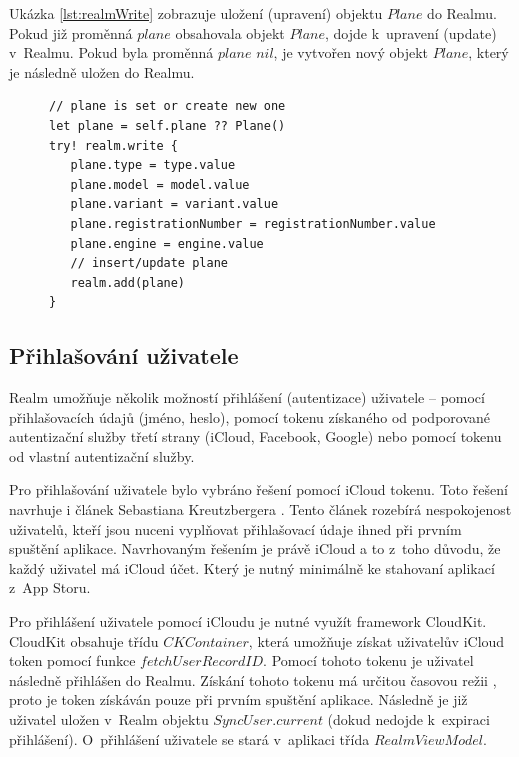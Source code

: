 \documentclass[thesis=M,czech]{FITthesis}[2012/06/26]
\begin{document}
Ukázka \ref{lst:realmWrite} zobrazuje uložení (upravení) objektu $Plane$ do Realmu. Pokud již proměnná $plane$ obsahovala objekt $Plane$, dojde k~upravení (update) v~Realmu. Pokud byla proměnná $plane$ $nil$, je vytvořen nový objekt $Plane$, který je následně uložen do Realmu.

\begin{figure}
\begin{minipage}{\linewidth}
\begin{lstlisting}[caption={Ukázka zápisu/úpravy Realm objektu},label={lst:realmWrite}]
// plane is set or create new one
let plane = self.plane ?? Plane()
try! realm.write {
   plane.type = type.value
   plane.model = model.value
   plane.variant = variant.value
   plane.registrationNumber = registrationNumber.value
   plane.engine = engine.value
   // insert/update plane      
   realm.add(plane)
}
\end{lstlisting}
\end{minipage}
\end{figure}
	
\subsection{Přihlašování uživatele}
\label{chap:login}
Realm umožňuje několik možností přihlášení (autentizace) uživatele -- pomocí přihlašovacích údajů (jméno, heslo), pomocí tokenu získaného od podporované autentizační služby třetí strany (iCloud, Facebook, Google) nebo pomocí tokenu od vlastní autentizační služby. \cite{realmDocs}

Pro přihlašování uživatele bylo vybráno řešení pomocí iCloud tokenu. Toto řešení navrhuje i článek Sebastiana Kreutzbergera \cite{loginUX}. Tento článek rozebírá nespokojenost uživatelů, kteří jsou nuceni vyplňovat přihlašovací údaje ihned při prvním spuštění aplikace. Navrhovaným řešením je právě iCloud a to z~toho důvodu, že každý uživatel má iCloud účet.  Který je nutný minimálně ke stahovaní aplikací z~App Storu.

Pro přihlášení uživatele pomocí iCloudu je nutné využít framework CloudKit. CloudKit obsahuje třídu $CKContainer$, která umožňuje získat uživatelův iCloud token pomocí funkce $fetchUserRecordID$. \cite{ckcontainer} Pomocí tohoto tokenu je uživatel následně přihlášen do Realmu. Získání tohoto tokenu má určitou časovou režii \cite{ckcontainer}, proto je token získáván pouze při prvním spuštění aplikace. Následně je již uživatel uložen v~Realm objektu $SyncUser.current$ (dokud nedojde k~expiraci přihlášení). O~přihlášení uživatele se stará v~aplikaci třída $RealmViewModel$.
\end{document}
